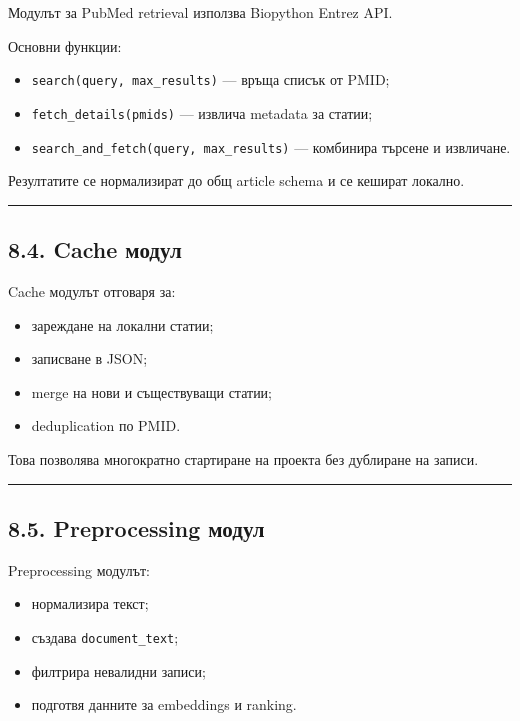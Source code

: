\documentclass[12pt,a4paper]{article}
\providecommand{\tightlist}{\setlength{\itemsep}{0pt}\setlength{\parskip}{0pt}}
\begin{document}
Модулът за PubMed retrieval използва Biopython Entrez API.

Основни функции:

\begin{itemize}
\tightlist
\item
  \texttt{search(query,\ max\_results)} --- връща списък от PMID;
\item
  \texttt{fetch\_details(pmids)} --- извлича metadata за статии;
\item
  \texttt{search\_and\_fetch(query,\ max\_results)} --- комбинира търсене и извличане.
\end{itemize}

Резултатите се нормализират до общ article schema и се кешират локално.

\vspace{0.5em}\hrule\vspace{1.0em}

\subsection{8.4. Cache модул}\label{cache-ux43cux43eux434ux443ux43b}

Cache модулът отговаря за:

\begin{itemize}
\tightlist
\item
  зареждане на локални статии;
\item
  записване в JSON;
\item
  merge на нови и съществуващи статии;
\item
  deduplication по PMID.
\end{itemize}

Това позволява многократно стартиране на проекта без дублиране на записи.

\vspace{0.5em}\hrule\vspace{1.0em}

\subsection{8.5. Preprocessing модул}\label{preprocessing-ux43cux43eux434ux443ux43b}

Preprocessing модулът:

\begin{itemize}
\tightlist
\item
  нормализира текст;
\item
  създава \texttt{document\_text};
\item
  филтрира невалидни записи;
\item
  подготвя данните за embeddings и ranking.
\end{itemize}
\end{document}
